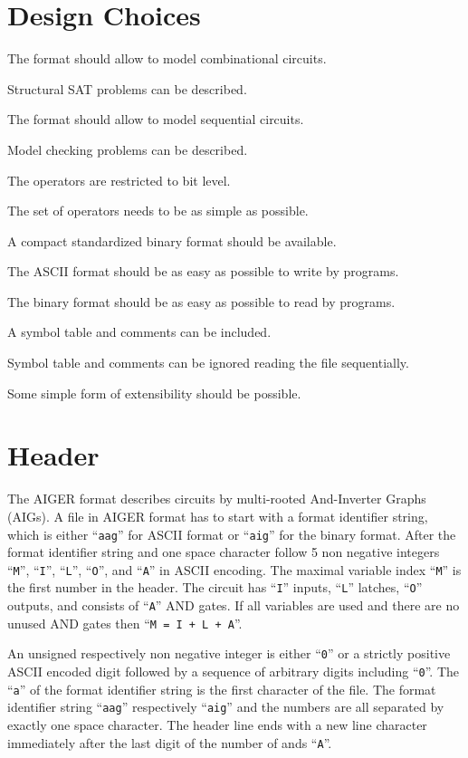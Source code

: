 \documentclass{llncs}
\begin{document}
\section{Design Choices}
  
  The format should allow to model combinational circuits.

  Structural SAT problems can be described.
  
  The format should allow to model sequential circuits.

  Model checking problems can be described.

  The operators are restricted to bit level.

  The set of operators needs to be as simple as possible.

  A compact standardized binary format should be available.

  The ASCII format should be as easy as possible to write by programs.

  The binary format should be as easy as possible to read by programs.

  A symbol table and comments can be included.

  Symbol table and comments can be ignored reading the file sequentially.

  Some simple form of extensibility should be possible.

\section{Header}

  The AIGER format describes circuits by multi-rooted And-Inverter Graphs
  (AIGs).  A file in AIGER format has to start with a format identifier
  string, which is either ``\texttt{aag}'' for ASCII format or ``\texttt{aig}'' for the binary
  format.  After the format identifier string and one space character
  follow 5 non negative integers ``\texttt{M}'', ``\texttt{I}'', ``\texttt{L}'',
  ``\texttt{O}'', and ``\texttt{A}'' in ASCII
  encoding.  The maximal variable index ``\texttt{M}'' is the first number in the
  header.  The circuit has ``\texttt{I}'' inputs, ``\texttt{L}'' latches,
  ``\texttt{O}'' outputs, and
  consists of ``\texttt{A}'' AND gates.  If all variables are used and there are no
  unused AND gates then ``\texttt{M = I + L + A}''.

  An unsigned respectively non negative integer is either ``\texttt{0}'' or a strictly
  positive ASCII encoded digit followed by a sequence of arbitrary digits
  including ``\texttt{0}''.  The ``\texttt{a}'' of the format identifier string is the first
  character of the file.  The format identifier string ``\texttt{aag}'' respectively
  ``\texttt{aig}'' and the numbers are all separated by exactly one space character.
  The header line ends with a new line character immediately after the
  last digit of the number of ands ``\texttt{A}''.
\end{document}
